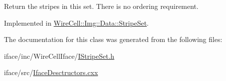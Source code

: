 Return the stripes in this set. There is no ordering requirement. 



Implemented in \hyperlink{class_wire_cell_1_1_img_1_1_data_1_1_stripe_set_aea07fe17999d5c62b2453d62cdc6fd05}{Wire\+Cell\+::\+Img\+::\+Data\+::\+Stripe\+Set}.



The documentation for this class was generated from the following files\+:\begin{DoxyCompactItemize}
\item 
iface/inc/\+Wire\+Cell\+Iface/\hyperlink{_i_stripe_set_8h}{I\+Stripe\+Set.\+h}\item 
iface/src/\hyperlink{_iface_desctructors_8cxx}{Iface\+Desctructors.\+cxx}\end{DoxyCompactItemize}
